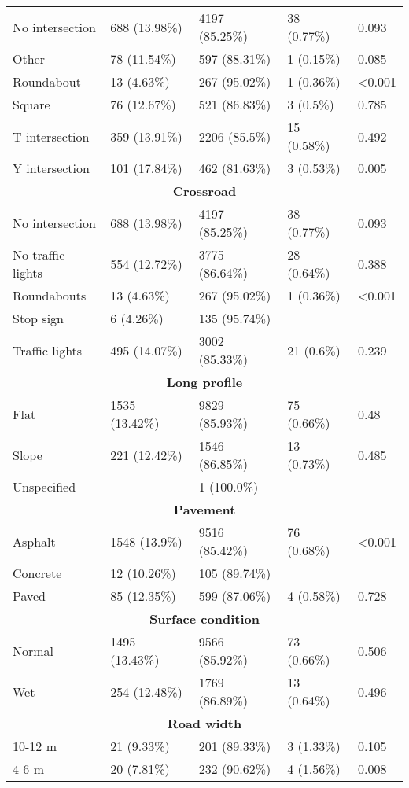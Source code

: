 \begin{longtable}{p{4.5cm}p{3cm}p{3cm}p{3cm}p{1.5cm}}
No intersection & 688 (13.98\%) & 4197 (85.25\%) & 38 (0.77\%) & 0.093  \\
Other & 78 (11.54\%) & 597 (88.31\%) & 1 (0.15\%) & 0.085  \\
Roundabout & 13 (4.63\%) & 267 (95.02\%) & 1 (0.36\%) & <0.001  \\
Square & 76 (12.67\%) & 521 (86.83\%) & 3 (0.5\%) & 0.785  \\
T intersection & 359 (13.91\%) & 2206 (85.5\%) & 15 (0.58\%) & 0.492  \\
Y intersection & 101 (17.84\%) & 462 (81.63\%) & 3 (0.53\%) & 0.005  \\
\hline
\multicolumn{5}{c}{\textbf{Crossroad}} \\
No intersection & 688 (13.98\%) & 4197 (85.25\%) & 38 (0.77\%) & 0.093  \\
No traffic lights & 554 (12.72\%) & 3775 (86.64\%) & 28 (0.64\%) & 0.388  \\
Roundabouts & 13 (4.63\%) & 267 (95.02\%) & 1 (0.36\%) & <0.001  \\
Stop sign & 6 (4.26\%) & 135 (95.74\%) &  &   \\
Traffic lights & 495 (14.07\%) & 3002 (85.33\%) & 21 (0.6\%) & 0.239  \\
\hline
\multicolumn{5}{c}{\textbf{Long profile}} \\
Flat & 1535 (13.42\%) & 9829 (85.93\%) & 75 (0.66\%) & 0.48  \\
Slope & 221 (12.42\%) & 1546 (86.85\%) & 13 (0.73\%) & 0.485  \\
Unspecified &  & 1 (100.0\%) &  &   \\
\hline
\multicolumn{5}{c}{\textbf{Pavement}} \\
Asphalt & 1548 (13.9\%) & 9516 (85.42\%) & 76 (0.68\%) & <0.001  \\
Concrete & 12 (10.26\%) & 105 (89.74\%) &  &   \\
Paved & 85 (12.35\%) & 599 (87.06\%) & 4 (0.58\%) & 0.728  \\
\hline
\multicolumn{5}{c}{\textbf{Surface condition}} \\
Normal & 1495 (13.43\%) & 9566 (85.92\%) & 73 (0.66\%) & 0.506  \\
Wet & 254 (12.48\%) & 1769 (86.89\%) & 13 (0.64\%) & 0.496  \\
\hline
\multicolumn{5}{c}{\textbf{Road width}} \\
10-12 m & 21 (9.33\%) & 201 (89.33\%) & 3 (1.33\%) & 0.105  \\
4-6 m & 20 (7.81\%) & 232 (90.62\%) & 4 (1.56\%) & 0.008  \\

\end{longtable}
